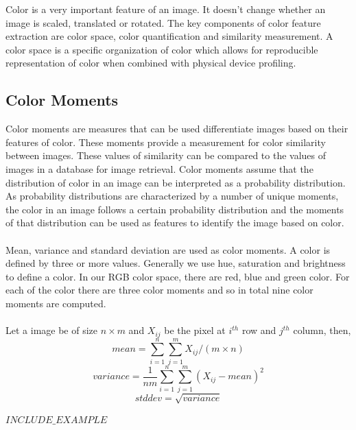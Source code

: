 \documentclass{report}
\begin{document}
Color is a very important feature of an image. It doesn’t change whether an image is scaled, translated or rotated. The key components of color feature extraction are color space, color quantification and similarity measurement. A color space is a specific organization of color which allows for reproducible representation of color when combined with physical device profiling.

\subsection{Color Moments}
Color moments are measures that can be used differentiate images based on their features of color. These moments provide a measurement for color similarity between images. These values of similarity can be compared to the values of images in a database for image retrieval. Color moments assume that the distribution of color in an image can be interpreted as a probability distribution. As probability distributions are characterized by a number of unique moments, the color in an image follows a certain probability distribution and the moments of that distribution can be used as features to identify the image based on color.\\
\\
Mean, variance and standard deviation are used as color moments. A color is defined by three or more values. Generally we use hue, saturation and brightness to define a color. In our RGB color space, there are red, blue and green color. For each of the color there are three color moments and so in total nine color moments are computed. \\
\\
Let a image be of size $n\times m$ and $X_{ij}$ be the pixel at $i^{th}$ row and $j^{th}$ column, then,\\
\begin{equation}
mean=\sum_{i=1}^{n}\sum_{j=1}^{m}X_{ij}/(m \times n)\label{eq:1}
\end{equation}
\begin{equation}
variance=\frac{1}{nm}\sum_{i=1}^{n}\sum_{j=1}^{m}(X_{ij}-mean)^{2}\label{eq:2}
\end{equation}
\begin{equation}
stddev=\sqrt{variance}\label{eq:3}
\end{equation}

$INCLUDE\_EXAMPLE$\\ 
\end{document}
